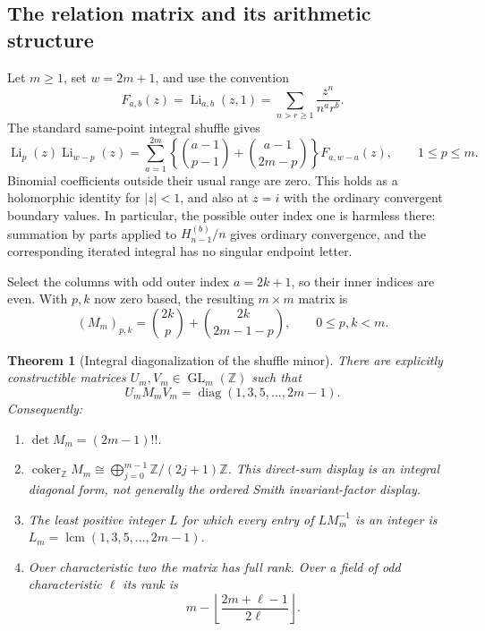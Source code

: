 \documentclass[11pt,letterpaper]{article}
\newtheorem{theorem}{Theorem}[section]
\theoremstyle{definition}
\theoremstyle{remark}
\begin{document}
\subsection{The relation matrix and its arithmetic structure}

Let $m\geq1$, set $w=2m+1$, and use the convention
\[
 F_{a,b}(z)=\operatorname{Li}_{a,b}(z,1)
 =\sum_{n>r\geq1}\frac{z^n}{n^a r^b}.
\]
The standard same-point integral shuffle gives
\begin{equation}\label{oi:eq:shuffle}
 \operatorname{Li}_{p}(z)\operatorname{Li}_{w-p}(z)
 =\sum_{a=1}^{2m}
 \left\{\binom{a-1}{p-1}+\binom{a-1}{2m-p}\right\}F_{a,w-a}(z),
 \qquad 1\leq p\leq m.
\end{equation}
Binomial coefficients outside their usual range are zero.  This holds
as a holomorphic identity for $|z|<1$, and also at $z=i$ with the
ordinary convergent boundary values.  In particular, the possible outer
index one is harmless there: summation by parts applied to
$H_{n-1}^{(b)}/n$ gives ordinary convergence, and the corresponding
iterated integral has no singular endpoint letter.

Select the columns with odd outer index $a=2k+1$, so their inner indices
are even.  With $p,k$ now zero based, the resulting $m\times m$ matrix is
\begin{equation}\label{oi:eq:M}
 (M_m)_{p,k}=
 \binom{2k}{p}+\binom{2k}{2m-1-p},
 \qquad 0\leq p,k<m.
\end{equation}

\begin{theorem}[Integral diagonalization of the shuffle minor]
\label{oi:thm:integral}
There are explicitly constructible matrices $U_m,V_m\in
\operatorname{GL}_m(\mathbb Z)$ such that
\begin{equation}\label{oi:eq:diagonal}
 U_mM_mV_m=\operatorname{diag}(1,3,5,\ldots,2m-1).
\end{equation}
Consequently:
\begin{enumerate}
 \item $\det M_m=(2m-1)!!$.
 \item $\operatorname{coker}_{\mathbb Z}M_m\cong
       \bigoplus_{j=0}^{m-1}\mathbb Z/(2j+1)\mathbb Z$.
       This direct-sum display is an integral diagonal form, not generally
       the ordered Smith invariant-factor display.
 \item The least positive integer $L$ for which every entry of
       $LM_m^{-1}$ is an integer is
       $L_m=\operatorname{lcm}(1,3,5,\ldots,2m-1)$.
 \item Over characteristic two the matrix has full rank.  Over a field
       of odd characteristic $\ell$ its rank is
       \[
       m-\left\lfloor\frac{2m+\ell-1}{2\ell}\right\rfloor.
       \]
\end{enumerate}
\end{theorem}
\end{document}
